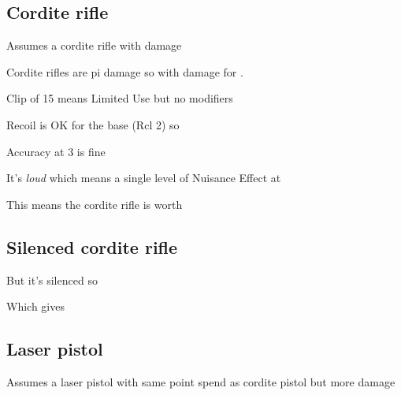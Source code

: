 \begin{center}
  \InnateAttackBreakdown
\end{center}
\subsection{Cordite rifle}
\label{sec:cordite-rifle}

Assumes a cordite rifle with  damage

\begin{innateattack}
  \item Cordite rifles are pi damage so  with
     damage for .
  \item Clip of 15 means Limited Use but no modifiers
  \item Recoil is OK for the base (Rcl 2) so 
  \item Accuracy at 3 is fine
  \item It's \emph{loud} which means a single level of Nuisance Effect at
  \item This means the cordite rifle is worth \InnateAttackTotalPoints{}
\end{innateattack}

\subsection{Silenced cordite rifle}
\label{sec:silenc-cord-rifle}

\begin{innateattack}
  \item {}
  \item But it's silenced so 
    
  \item Which gives \InnateAttackTotalPoints{}
\end{innateattack}
\begin{center}
  \InnateAttackBreakdown
\end{center}

\subsection{Laser pistol}
\label{sec:laser-pistol}

Assumes a laser pistol with same point spend as cordite pistol but more damage

